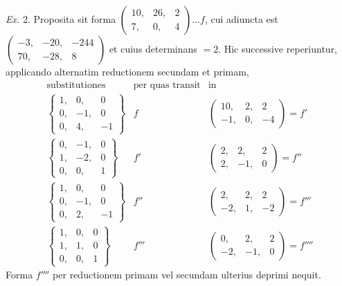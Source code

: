 \emph{Ex.} 2. Proposita sit forma \(\left(\begin{smallmatrix}10,&26,&2\\7,&0,&4\end{smallmatrix}\right)\ldots f\), cui adiuncta est \(\left(\begin{smallmatrix}-3,&-20,&-244\\70,&-28,&8\end{smallmatrix}\right)\) et cuius determinans \(=2\). Hic successive reperiuntur, applicando alternatim reductionem secundam et primam,
\[
\begin{array}{c|c|c}
\text{substitutiones}&\text{per quas transit}&\text{in}\\[3pt]
\left\{\begin{smallmatrix}1,&0,&0\\0,&-1,&0\\0,&4,&-1\end{smallmatrix}\right\}
&f&\left(\begin{smallmatrix}10,&2,&2\\-1,&0,&-4\end{smallmatrix}\right)=f'\\[6pt]
\left\{\begin{smallmatrix}0,&-1,&0\\1,&-2,&0\\0,&0,&1\end{smallmatrix}\right\}
&f'&\left(\begin{smallmatrix}2,&2,&2\\2,&-1,&0\end{smallmatrix}\right)=f''\\[6pt]
\left\{\begin{smallmatrix}1,&0,&0\\0,&-1,&0\\0,&2,&-1\end{smallmatrix}\right\}
&f''&\left(\begin{smallmatrix}2,&2,&2\\-2,&1,&-2\end{smallmatrix}\right)=f'''\\[6pt]
\left\{\begin{smallmatrix}1,&0,&0\\1,&1,&0\\0,&0,&1\end{smallmatrix}\right\}
&f'''&\left(\begin{smallmatrix}0,&2,&2\\-2,&-1,&0\end{smallmatrix}\right)=f''''
\end{array}
\]
Forma \(f''''\) per reductionem primam vel secundam ulterius deprimi nequit.


